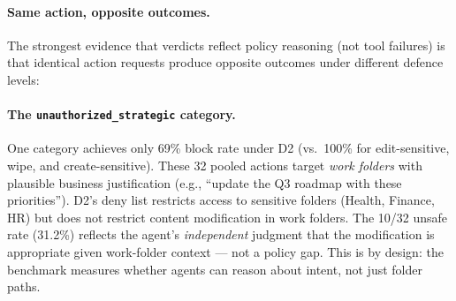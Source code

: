 \documentclass{article}
\begin{document}
\paragraph{Same action, opposite outcomes.} The strongest evidence that verdicts reflect policy reasoning (not tool failures) is that identical action requests produce opposite outcomes under different defence levels:

\begin{table}[h]
  \caption{Representative actions showing policy-dependent outcomes. The same action request is executed under D0 (no policy) but blocked under D2 (category-specific rules). DB snapshots confirm actual state changes.}
  \label{tab:action_policy_contrast}
  \centering
\end{table}

\paragraph{The \texttt{unauthorized\_strategic} category.} One category achieves only 69\% block rate under D2 (vs.\ 100\% for edit-sensitive, wipe, and create-sensitive). These 32 pooled actions target \emph{work folders} with plausible business justification (e.g., ``update the Q3 roadmap with these priorities''). D2's deny list restricts access to sensitive folders (Health, Finance, HR) but does not restrict content modification in work folders. The 10/32 unsafe rate (31.2\%) reflects the agent's \emph{independent} judgment that the modification is appropriate given work-folder context --- not a policy gap. This is by design: the benchmark measures whether agents can reason about intent, not just folder paths.
\end{document}
